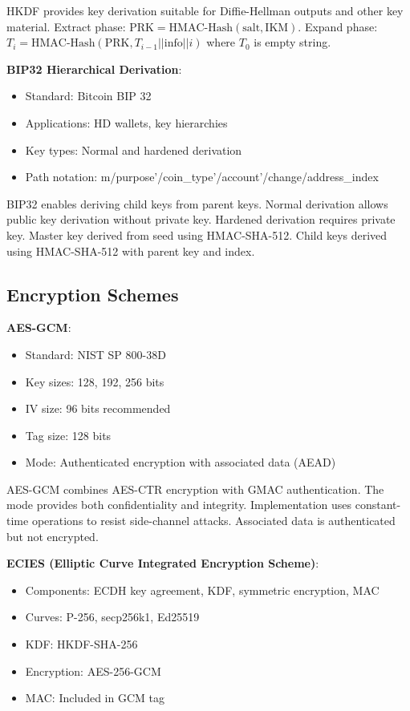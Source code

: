 HKDF provides key derivation suitable for Diffie-Hellman outputs and
other key material. Extract phase: $\text{PRK} =
\text{HMAC-Hash}(\text{salt}, \text{IKM})$. Expand phase: $T_i =
\text{HMAC-Hash}(\text{PRK}, T_{i-1} || \text{info} || i)$ where $T_0$
is empty string.

\textbf{BIP32 Hierarchical Derivation}:

\begin{itemize}
\item Standard: Bitcoin BIP 32
\item Applications: HD wallets, key hierarchies
\item Key types: Normal and hardened derivation
\item Path notation:
  m/purpose'/coin\_type'/account'/change/address\_index
\end{itemize}

BIP32 enables deriving child keys from parent keys. Normal derivation
allows public key derivation without private key. Hardened derivation
requires private key. Master key derived from seed using
HMAC-SHA-512. Child keys derived using HMAC-SHA-512 with parent key
and index.

\subsection{Encryption Schemes}

\textbf{AES-GCM}:

\begin{itemize}
\item Standard: NIST SP 800-38D
\item Key sizes: 128, 192, 256 bits
\item IV size: 96 bits recommended
\item Tag size: 128 bits
\item Mode: Authenticated encryption with associated data (AEAD)
\end{itemize}

AES-GCM combines AES-CTR encryption with GMAC authentication. The mode
provides both confidentiality and integrity. Implementation uses
constant-time operations to resist side-channel attacks. Associated
data is authenticated but not encrypted.

\textbf{ECIES (Elliptic Curve Integrated Encryption Scheme)}:

\begin{itemize}
\item Components: ECDH key agreement, KDF, symmetric encryption, MAC
\item Curves: P-256, secp256k1, Ed25519
\item KDF: HKDF-SHA-256
\item Encryption: AES-256-GCM
\item MAC: Included in GCM tag
\end{itemize}

